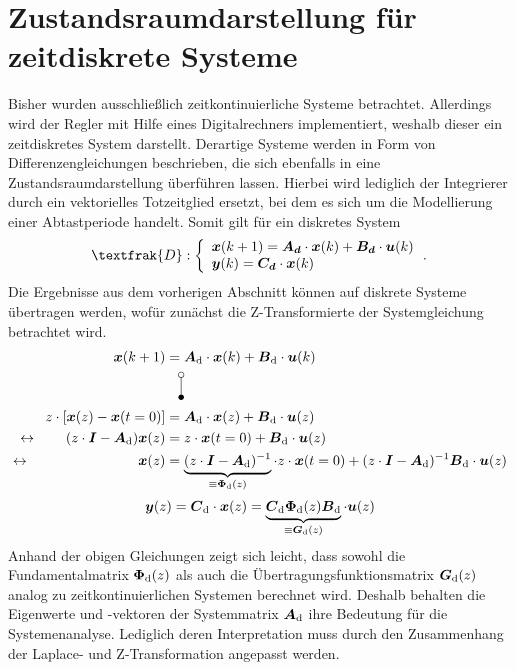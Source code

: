 \section{Zustandsraumdarstellung für zeitdiskrete Systeme}
Bisher wurden ausschließlich zeitkontinuierliche Systeme betrachtet. Allerdings wird der Regler mit Hilfe eines Digitalrechners implementiert, weshalb dieser ein zeitdiskretes System darstellt.  Derartige Systeme werden in Form von Differenzengleichungen beschrieben, die sich ebenfalls in eine Zustandsraumdarstellung überführen lassen. Hierbei wird lediglich der Integrierer durch ein vektorielles Totzeitglied ersetzt, bei dem es sich um die Modellierung einer Abtastperiode handelt.  Somit gilt für ein diskretes System 
\begin{equation}
\textfrak{D} : \left\{ \begin{array}{ll}
\bs{{x}}(k+1) = \bs{A_d}\cdot \bs{x}(k) + \bs{B_d}\cdot \bs{u}(k) \\
\bs{y}(k) = \bs{C_d}\cdot \bs{x}(k)
\end{array}\,.
\right.
\label{eq_discrete_ss}
\end{equation}
Die Ergebnisse aus dem vorherigen Abschnitt können auf diskrete Systeme übertragen werden, wofür zunächst die Z-Transformierte der Systemgleichung betrachtet wird.
\begin{align}
\bs{x}(k+1) &= \bs{A}\idx{d}\cdot \bs{x}(k)+\bs{B}\idx{d}\cdot \bs{u}(k)
\nonumber \\
&\hspace{5pt}\vlaplace \nonumber \\
z\cdot \left[\bs{x}(z)- \bs{x}(t=0)\right] &= \bs{A}\idx{d}\cdot \bs{x}(z) + \bs{B}\idx{d}\cdot \bs{u}(z) \nonumber \nonumber \\
\leftrightarrow\hspace{20pt}
(z\cdot\bs{I}-\bs{A}\idx{d})\bs{x}(z) &= z\cdot \bs{x}(t=0)+\bs{B}\idx{d}\cdot \bs{u}(z) \nonumber
\\
\leftrightarrow\hspace{77pt}
\bs{x}(z) &= \underbrace{(z\cdot\bs{I}-\bs{A}\idx{d})^{-1}}_{\equiv \bs{\Phi}\idx{d}(z)}\cdot z\cdot \bs{x}(t=0) + (z\cdot \bs{I}-\bs{A}\idx{d})^{-1}\bs{B}\idx{d}\cdot \bs{u}(z)
\end{align}
\begin{equation}
\boldsymbol{y}(z) = \boldsymbol{C}_{\text{d}}\cdot \boldsymbol{x}(z) = \underbrace{\boldsymbol{C}_{\text{d}}\boldsymbol{\Phi}_{\text{d}}(z)\boldsymbol{B}_{\text{d}}}_{\equiv \boldsymbol{G}_{\text{d}}(z)}\cdot \boldsymbol{u}(z)
\end{equation}
Anhand der obigen Gleichungen zeigt sich leicht, dass sowohl die Fundamentalmatrix $\boldsymbol{\Phi}_{\text{d}}(z)$ als auch die Übertragungsfunktionsmatrix $\boldsymbol{G}_{\text{d}}(z)$ analog zu zeitkontinuierlichen Systemen berechnet wird. Deshalb behalten die Eigenwerte und -vektoren der Systemmatrix $\boldsymbol{A}_{\text{d}}$ ihre Bedeutung für die Systemenanalyse. Lediglich deren Interpretation muss durch den Zusammenhang der Laplace- und Z-Transformation angepasst werden.

